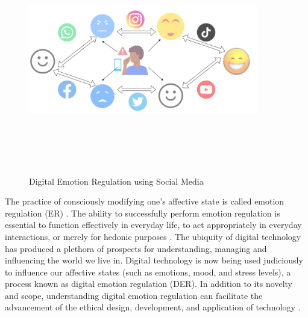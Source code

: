 \begin{figure}[h]
  
    \centering
    \includegraphics[width=10cm,height=10cm,keepaspectratio]{DER.pdf}
  \caption{Digital Emotion Regulation using Social Media}
  \label{fig:SMER}
  \end{figure}
The practice of consciously modifying one's affective state is called emotion regulation (ER) \cite{gross1998emerging}. The ability to successfully perform emotion regulation is essential to function effectively in everyday life, to act appropriately in everyday interactions, or merely for hedonic purposes \cite{webb2012dealing}. The ubiquity of digital technology has produced a plethora of prospects for understanding, managing and influencing the world we live in. Digital technology is now being used judiciously to influence our affective states (such as emotions, mood, and stress levels), a process known as digital emotion regulation (DER). In addition to its novelty and scope, understanding digital emotion regulation can facilitate the advancement of the ethical design, development, and application of technology \cite{wadley2020digital}.


